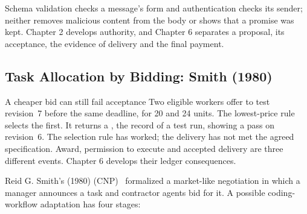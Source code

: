 Schema validation checks a message's form and authentication checks its
sender; neither removes malicious content from the body or shows that a
promise was kept. Chapter 2 develops authority, and Chapter 6 separates a
proposal, its acceptance, the evidence of delivery and the final payment.


\subsection{Task Allocation by Bidding: Smith (1980)}

\begin{pdexample}{A cheaper bid can still fail acceptance}
Two eligible workers offer to test revision~7 before the same deadline, for
20 and 24 units. The lowest-price rule selects the first. It returns a
, the record of a test run, showing a pass on revision~6. The selection rule has worked; the delivery has not
met the agreed \mbox{specification}. Award, permission to execute and accepted delivery
are three different events. Chapter 6 develops their ledger consequences.
\end{pdexample}

Reid G. Smith's (1980)  (CNP)~ formalized a market-like negotiation in which a manager announces a task and contractor agents bid for it. A possible coding-workflow adaptation has four stages:

